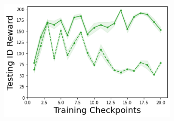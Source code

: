 \begin{figure}
\begin{subfigure}{.24\textwidth}
    \end{subfigure}
    \begin{subfigure}{.24\textwidth}
        \includegraphics[width=\textwidth]{sections/011_icml2022/resources/PostNet-CartPole-v0-mean_reward_-testing-strategy.png}
    \end{subfigure}
    

\end{figure}
